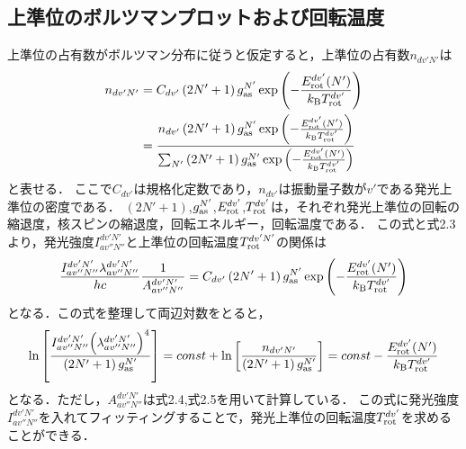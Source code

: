 \subsection{上準位のボルツマンプロットおよび回転温度}
上準位の占有数がボルツマン分布に従うと仮定すると，上準位の占有数$n_{dv'N'}$は
\begin{equation}
\begin{split}
    n_{dv'N'} &= C_{dv'} \left(  2N'+1 \right) g^{N'}_{\rm as} \exp \left(-\frac{E^{dv'}_{\rm rot}(N')}{k_{\rm B} T^{dv'}_{\rm rot}} \right)\\
    &= \frac{ n_{dv'} \left(  2N'+1 \right) g^{N'}_{\rm as} \exp \left(-\frac{E^{dv'}_{\rm rot}(N')}{k_{\rm B} T^{dv'}_{\rm rot}} \right) }{ \sum_{N'} \left(  2N'+1 \right) g^{N'}_{\rm as} \exp \left(-\frac{E^{dv'}_{\rm rot}(N')}{k_{\rm B} T^{dv'}_{\rm rot}} \right)}
\end{split}
\end{equation}
と表せる．
ここで$C_{dv'}$は規格化定数であり，$n_{dv'}$は振動量子数が$v'$である発光上準位の密度である．
$(2N'+1)$,$g^{N'}_{\rm as}$,$E^{dv'}_{\rm rot}$,$T^{dv'}_{\rm rot}$は，それぞれ発光上準位の回転の縮退度，核スピンの縮退度，回転エネルギー，回転温度である．
この式と式2.3より，発光強度$I^{dv'N'}_{av''N''}$と上準位の回転温度$T^{dv'N'}_{\rm rot}$の関係は
\begin{equation}
    \frac{I^{dv'N'}_{av''N''}\lambda^{dv'N'}_{av''N''}}{hc}\frac{1}{A^{dv'N'}_{av''N''}} = C_{dv'} \left(  2N'+1 \right) g^{N'}_{\rm as} \exp \left(-\frac{E^{dv'}_{\rm rot}(N')}{k_{\rm B} T^{dv'}_{\rm rot}} \right)
\end{equation}
となる．この式を整理して両辺対数をとると，
\begin{equation}
    \ln \left[ \frac{I^{dv'N'}_{av''N''} {\left( \lambda^{dv'N'}_{av''N''} \right)}^4}{\left( 2N'+1 \right) g^{N'}_{\rm as}} \right] = const + \ln \left[ \frac{n_{dv'N'}}{\left( 2N'+1 \right) g^{N'}_{\rm as}} \right]
    = const - \frac{E^{dv'}_{\rm rot}(N')}{k_{\rm B} T^{dv'}_{\rm rot}}
\end{equation}
となる．ただし，$A^{dv'N'}_{av''N''}$は式2.4,式2.5を用いて計算している．
この式に発光強度$I^{dv'N'}_{av''N''}$を入れてフィッティングすることで，発光上準位の回転温度$T^{dv'}_{\rm rot}$を求めることができる．

